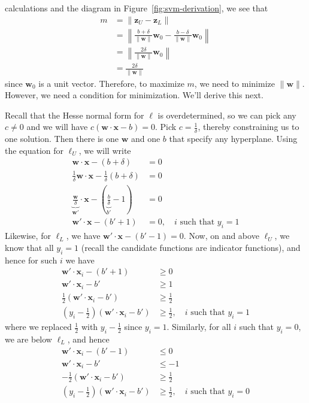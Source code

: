 \documentclass[12pt, a4paper]{article}
\theoremstyle{definition}
\begin{document}
	calculations and the diagram in Figure~\ref{fig:svm-derivation}, we see that
	\begin{align*}
		m &= \|\mathbf{z}_U-\mathbf{z}_L\|\\
		&=\left\|
		\frac{b+\delta}{\|\mathbf{w}\|}\mathbf{w}_0-\frac{b-\delta}{\|\mathbf{w}\|}\mathbf{w}_0
		\right\|\\
		&=\left\|\frac{2\delta}{\|\mathbf{w}\|}\mathbf{w}_0\right\|\\
		&=\frac{2\delta}{\|\mathbf{w}\|}
	\end{align*}
	since $\mathbf{w}_0$ is a unit vector. Therefore, to maximize $m$, we need to minimize
	$\|\mathbf{w}\|$. However, we need a condition for minimization. We'll derive this next.
	
	Recall that the Hesse normal form for $\ell$ is overdetermined, so we can pick any $c\neq 0$
	and we will have $c(\mathbf{w}\cdot \mathbf{x}-b)=0$. Pick $c=\frac{1}{\delta}$,
	thereby constraining us to one solution. Then there is one $\mathbf{w}$ and one $b$
	that specify any hyperplane. Using the equation for $\ell_U$, we will write
	\begin{align*}
		\mathbf{w}\cdot \mathbf{x}-(b+\delta)&=0\\
		\frac{1}{\delta}\mathbf{w}\cdot \mathbf{x}-\frac{1}{\delta}(b+\delta)&=0\\
		\underbrace{\frac{\mathbf{w}}{\delta}}_{\mathbf{w}'}\cdot \mathbf{x}
		-\left(\underbrace{\frac{b}{\delta}}_{b'}-1\right)&=0\\
		\mathbf{w}'\cdot \mathbf{x}-(b'+1)&=0,\quad i \text{ such that } y_i=1
	\end{align*}
	Likewise, for $\ell_L$, we have $\mathbf{w}'\cdot \mathbf{x}-(b'-1)=0$. Now,
	on and above $\ell_U$, we know that all $y_i=1$ (recall the candidate functions are indicator
	functions), and hence for such $i$ we have
	\begin{align*}
		\mathbf{w}'\cdot \mathbf{x}_i-(b'+1)&\geq 0\\
		\mathbf{w}'\cdot \mathbf{x}_i-b'&\geq 1\\
		\frac{1}{2}\left(\mathbf{w}'\cdot \mathbf{x}_i-b'\right)&\geq \frac{1}{2}\\
		\left(y_i-\frac{1}{2}\right)\left(\mathbf{w}'\cdot \mathbf{x}_i-b'\right)&\geq \frac{1}{2},
		\quad i \text{ such that }y_i=1
	\end{align*}
	where we replaced $\frac{1}{2}$ with $y_i-\frac{1}{2}$ since $y_i=1$. Similarly,
	for all $i$ such that $y_i=0$, we are below $\ell_L$, and hence
	\begin{align*}
		\mathbf{w}'\cdot \mathbf{x}_i-(b'-1)&\leq 0\\
		\mathbf{w}'\cdot \mathbf{x}_i-b'&\leq -1\\
		-\frac{1}{2}\left(\mathbf{w}'\cdot \mathbf{x}_i-b'\right)&\geq \frac{1}{2}\\
		\left(y_i-\frac{1}{2}\right)\left(\mathbf{w}'\cdot \mathbf{x}_i-b'\right)&\geq \frac{1}{2},
		\quad i \text{ such that } y_i=0
	\end{align*}
\end{document}
